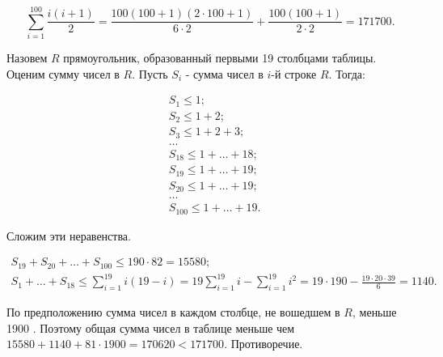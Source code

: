 $$
\sum_{i=1}^{100} \frac{i(i+1)}{2}=\frac{100(100+1)(2 \cdot 100+1)}{6 \cdot 2}+\frac{100(100+1)}{2 \cdot 2}=171700 .
$$


Назовем $R$ прямоугольник, образованный первыми 19 столбцами таблицы. Оценим сумму чисел в $R$. Пусть $S_i$ - сумма чисел в $i$-й строке $R$. Тогда:

$$
\begin{aligned}
& S_1 \leqslant 1 ; \\
& S_2 \leqslant 1+2 ; \\
& S_3 \leqslant 1+2+3 ; \\
& \ldots \\
& S_{18} \leqslant 1+\ldots+18 ; \\
& S_{19} \leqslant 1+\ldots+19 ; \\
& S_{20} \leqslant 1+\ldots+19 ; \\
& \ldots \\
& S_{100} \leqslant 1+\ldots+19 .
\end{aligned}
$$


Сложим эти неравенства.

$$
\begin{gathered}
S_{19}+S_{20}+\ldots+S_{100} \leqslant 190 \cdot 82=15580 ; \\
S_1+\ldots+S_{18} \leqslant \sum_{i=1}^{19} i(19-i)=19 \sum_{i=1}^{19} i-\sum_{i=1}^{19} i^2=19 \cdot 190-\frac{19 \cdot 20 \cdot 39}{6}=1140 .
\end{gathered}
$$


По предположению сумма чисел в каждом столбце, не вошедшем в $R$, меньше 1900 . Поэтому общая сумма чисел в таблице меньше чем $15580+1140+81 \cdot 1900= 170620<171700$. Противоречие.